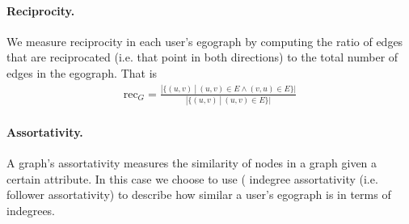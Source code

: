 \paragraph{Reciprocity.} We measure reciprocity in each user's egograph by computing the ratio of edges that are reciprocated (i.e. that point in both directions) to the total number of edges in the egograph. That is
\begin{align*}
   \mathrm{rec}_G = \frac{|\{(u,v) \ | \ (u,v) \in E \wedge (v,u) \in E \}|}{|\{ (u,v) \ | \ (u,v) \in E \}|}
\end{align*}

\paragraph{Assortativity.} A graph's assortativity measures the similarity of nodes in a graph given a certain attribute. In this case we choose to use ( indegree assortativity (i.e. follower assortativity) to describe how similar a user's egograph is in terms of indegrees.

